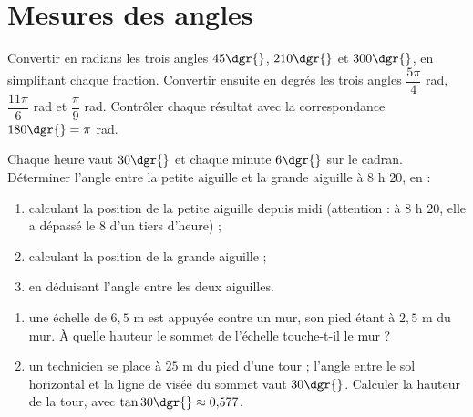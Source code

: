 \clearpage
\chapter{Mesures des angles}

\begin{exercice}
Convertir en radians les trois angles $45\dgr{}$, $210\dgr{}$ et $300\dgr{}$, en simplifiant chaque fraction. Convertir ensuite en degrés les trois angles $\dfrac{5\pi}{4}$ rad, $\dfrac{11\pi}{6}$ rad et $\dfrac{\pi}{9}$ rad. Contrôler chaque résultat avec la correspondance $180\dgr{} = \pi$ rad.
\end{exercice}

\begin{exercice}
Chaque heure vaut $30\dgr{}$ et chaque minute $6\dgr{}$ sur le cadran. Déterminer l'angle entre la petite aiguille et la grande aiguille à $8$ h $20$, en :
\begin{enumerate}
\item calculant la position de la petite aiguille depuis midi (attention : à $8$ h $20$, elle a dépassé le $8$ d'un tiers d'heure) ;
\item calculant la position de la grande aiguille ;
\item en déduisant l'angle entre les deux aiguilles.
\end{enumerate}
\end{exercice}

\begin{exercice}
\begin{enumerate}
\item une échelle de $6{,}5$ m est appuyée contre un mur, son pied étant à $2{,}5$ m du mur. À quelle hauteur le sommet de l'échelle touche-t-il le mur ?
\item un technicien se place à $25$ m du pied d'une tour ; l'angle entre le sol horizontal et la ligne de visée du sommet vaut $30\dgr{}$. Calculer la hauteur de la tour, avec $\tan 30\dgr{} \approx 0{,}577$.
\end{enumerate}
\end{exercice}

